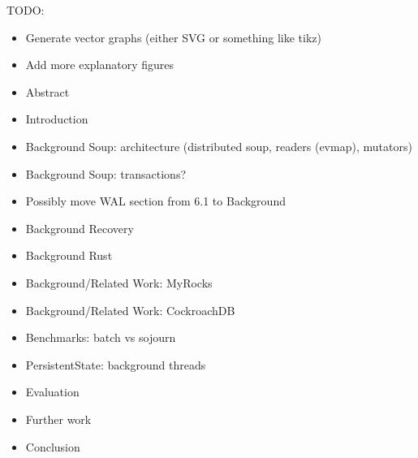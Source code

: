 \color{purple}
TODO:
\begin{itemize}
  \item Generate vector graphs (either SVG or something like tikz)
  \item Add more explanatory figures

  \item Abstract
  \item Introduction

  \item Background Soup: architecture (distributed soup, readers (evmap), mutators)
  \item Background Soup: transactions?
  \item Possibly move WAL section from 6.1 to Background

  \item Background Recovery
  \item Background Rust

  \item Background/Related Work: MyRocks
  \item Background/Related Work: CockroachDB

  \item Benchmarks: batch vs sojourn

  \item PersistentState: background threads

  \item Evaluation
  \item Further work
  \item Conclusion
\end{itemize}

